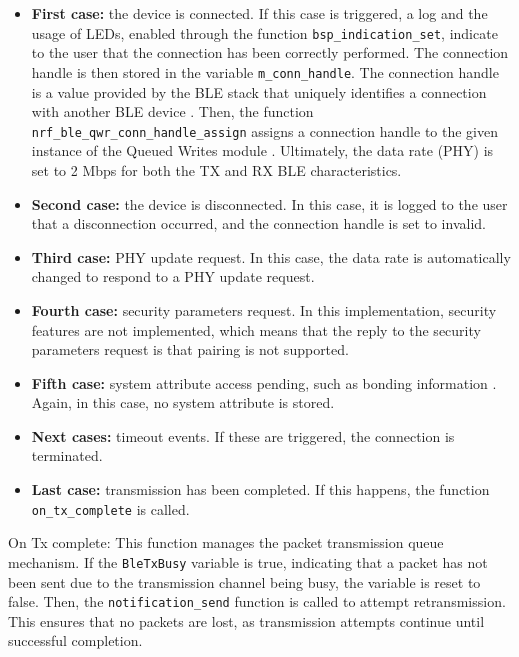 \documentclass{Configuration_Files/PoliMi3i_thesis}
\begin{document}
\begin{itemize}
    \item \textbf{First case:} the device is connected. If this case is triggered, a log and the usage of LEDs, enabled through the function \texttt{bsp\_indication\_set}, indicate to the user that the connection has been correctly performed. The connection handle is then stored in the variable \texttt{m\_conn\_handle}. The connection handle is a value provided by the BLE stack that uniquely identifies a connection with another BLE device \cite{BluetoothLowEnergy2016}. Then, the function \texttt{nrf\_ble\_qwr\_conn\_handle\_assign} assigns a connection handle to the given instance of the Queued Writes module \cite{NordicSemiconductorInfocenterd}. Ultimately, the data rate (PHY) is set to 2 Mbps for both the TX and RX BLE characteristics.
    
    \item \textbf{Second case:} the device is disconnected. In this case, it is logged to the user that a disconnection occurred, and the connection handle is set to invalid.
    
    \item \textbf{Third case:} PHY update request. In this case, the data rate is automatically changed to respond to a PHY update request.
    
    \item \textbf{Fourth case:} security parameters request. In this implementation, security features are not implemented, which means that the reply to the security parameters request is that pairing is not supported.
    
    \item \textbf{Fifth case:} system attribute access pending, such as bonding information \cite{NordicSemiconductorInfocenterf}. Again, in this case, no system attribute is stored.
    
    \item \textbf{Next cases:} timeout events. If these are triggered, the connection is terminated.
    
    \item \textbf{Last case:} transmission has been completed. If this happens, the function \texttt{on\_tx\_complete} is called.
\end{itemize}


On Tx complete: This function manages the packet transmission queue mechanism. If the \texttt{BleTxBusy} variable is true, indicating that a packet has not been sent due to the transmission channel being busy, the variable is reset to false. Then, the \texttt{notification\_send} function is called to attempt retransmission. This ensures that no packets are lost, as transmission attempts continue until successful completion.
\end{document}
